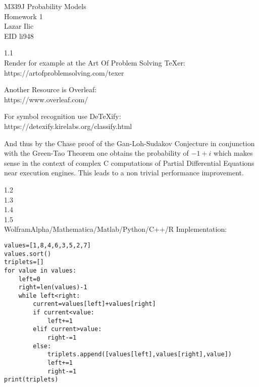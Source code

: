 \Large
M339J Probability Models \\
Homework 1 \\
Lazar Ilic \\
EID li948

1.1 \\
Render for example at the Art Of Problem Solving TeXer: \\
https://artofproblemsolving.com/texer

Another Resource is Overleaf: \\
https://www.overleaf.com/

For symbol recognition use DeTeXify: \\
https://detexify.kirelabs.org/classify.html

And thus by the Chase proof of the Gan-Loh-Sudakov Conjecture in conjunction with the Green-Tao Theorem one obtains the probability of $\boxed{-1+i}$ which makes sense in the context of complex C computations of Partial Differential Equations near execution engines. This leads to a non trivial performance improvement.

1.2 \\


1.3 \\


1.4 \\


1.5 \\


WolframAlpha/Mathematica/Matlab/Python/C++/R Implementation:

\begin{verbatim}
values=[1,8,4,6,3,5,2,7]
values.sort()
triplets=[]
for value in values:
    left=0
    right=len(values)-1
    while left<right:
        current=values[left]+values[right]
        if current<value:
            left+=1
        elif current>value:
            right-=1
        else:
            triplets.append([values[left],values[right],value])
            left+=1
            right-=1
print(triplets)
\end{verbatim}